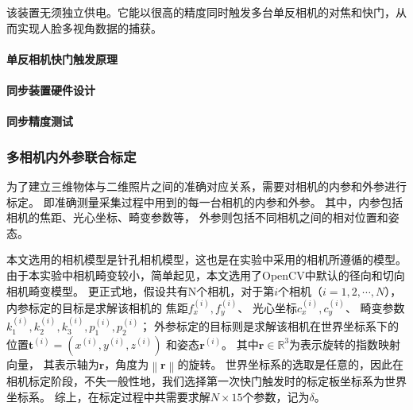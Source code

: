 \documentclass{ctexart}
\begin{document}
该装置无须独立供电。它能以很高的精度同时触发多台单反相机的对焦和快门，从而实现人脸多视角数据的捕获。

\paragraph{单反相机快门触发原理}

\paragraph{同步装置硬件设计}

\paragraph{同步精度测试}

\subsubsection{多相机内外参联合标定}

为了建立三维物体与二维照片之间的准确对应关系，需要对相机的内参和外参进行标定。
即准确测量采集过程中用到的每一台相机的内参和外参。
其中，内参包括相机的焦距、光心坐标、畸变参数等，
外参则包括不同相机之间的相对位置和姿态。

本文选用的相机模型是针孔相机模型，这也是在实验中采用的相机所遵循的模型。
由于本实验中相机畸变较小，简单起见，本文选用了OpenCV中默认的径向和切向相机畸变模型\cite{?}。
更正式地，假设共有N个相机，对于第$i$个相机（$i=1,2,\cdots,N$），
内参标定的目标是求解该相机的
焦距$f_x^{(i)},f_y^{(i)}$、
光心坐标$c_x^{(i)},c_y^{(i)}$、
畸变参数$k_1^{(i)},k_2^{(i)},k_3^{(i)},p_1^{(i)},p_2^{(i)}$；
外参标定的目标则是求解该相机在世界坐标系下的
位置$\mathbf{t}^{(i)}=\left(x^{(i)},y^{(i)},z^{(i)}\right)$
和姿态$\mathbf{r}^{(i)}$。
其中$\mathbf{r}\in \mathbb{R}^3$为表示旋转的指数映射向量\cite{?}，
其表示轴为$\mathbf{r}$，角度为$\left\| \mathbf{r}\right\|$的旋转。
世界坐标系的选取是任意的，因此在相机标定阶段，不失一般性地，我们选择第一次快门触发时的标定板坐标系为世界坐标系。
综上，在标定过程中共需要求解$N\times 15$个参数，记为$\delta$。
\end{document}
